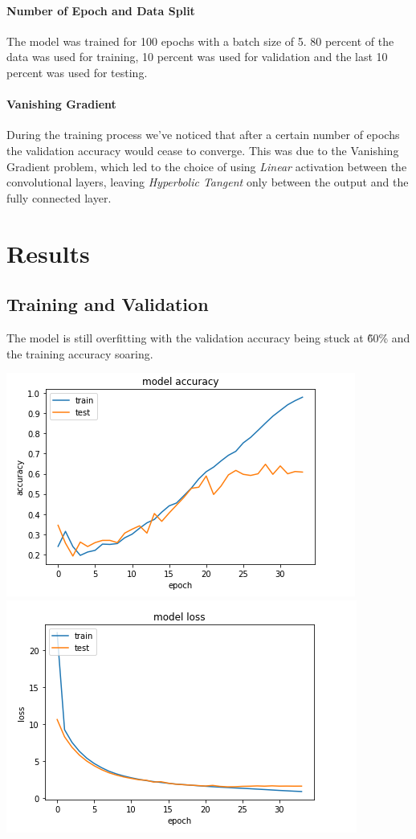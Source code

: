 \documentclass{article}
\begin{document}
\paragraph{Number of Epoch and Data Split}
The model was trained for 100 epochs with a batch size of 5. 80 percent of the data was used 
for training, 10 percent was used for validation and the last 10 percent was used for testing. 

\paragraph{Vanishing Gradient} 

During the training process we've noticed that after a certain number of epochs 
the validation accuracy would cease to converge. This was due to the Vanishing 
Gradient problem, which led to the choice of using \emph{Linear} activation between the 
convolutional layers, leaving \emph{Hyperbolic Tangent} only between the output and 
the fully connected layer. 

\section{Results}

\subsection{Training and Validation}

The model is still overfitting with the validation accuracy being stuck at \~60\% and the training accuracy soaring. 

\begin{center}
    \includegraphics[scale=0.5]{acc}
		\includegraphics[scale=0.5]{loss}
\end{center}
\end{document}
